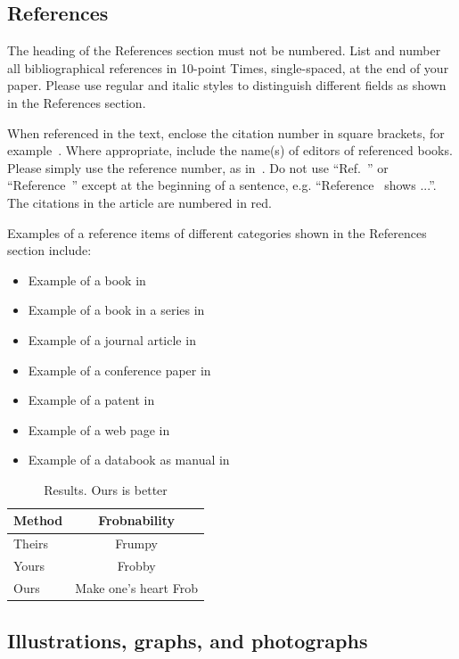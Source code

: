 \subsection{References}

The heading of the References section must not be numbered. List and number all bibliographical references in 10-point Times, single-spaced, at the end of your paper. Please use regular and italic styles to distinguish different fields as shown in the References section. 

When referenced in the text, enclose the citation number in square brackets, for example~\cite{b3}.  Where appropriate, include the name(s) of editors of referenced books. Please simply use the reference number, as in~\cite{b3}.  Do not use ``Ref.~\cite{b3}'' or ``Reference~\cite{b3}'' except at the beginning of a sentence, e.g.  ``Reference~\cite{b3} shows ...''. The citations in the article are numbered in red.

Examples of a reference items of different categories shown in the References section include:
\begin{itemize}
\item Example of a book in~\cite{b4}
\item Example of a book in a series in~\cite{b9}
\item Example of a journal article in~\cite{b1}
\item Example of a conference paper in~\cite{b7}
\item Example of a patent in~\cite{b8}
\item Example of a web page in~\cite{b6}
\item Example of a databook as manual in~\cite{b5}
\end{itemize}

\begin{table}[ht]
\centering
\caption{Results. Ours is better}
\label{tab:comparison}
\begin{tabular}{|l|c|}
\hline
Method & Frobnability \\ \hline
Theirs & Frumpy \\ \hline
Yours & Frobby \\ \hline
Ours & Make one’s heart Frob \\ \hline
\end{tabular}
\end{table}
\subsection{Illustrations, graphs, and photographs}

